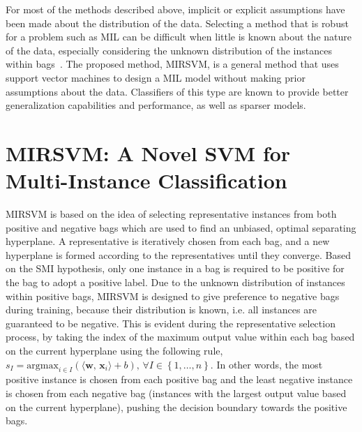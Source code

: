 \documentclass[reqno]{vcuthesis}
\newcommand{\set}[1]{{\left\{#1\right\}}}
\numberwithin{equation}{chapter}
\begin{document}
For most of the methods described above, implicit or explicit assumptions have been made about the distribution of the data. Selecting a method that is robust for a problem such as MIL can be difficult when little is known about the nature of the data, especially considering the unknown distribution of the instances within bags~\cite{Amores2013}. The proposed method, MIRSVM, is a general method that uses support vector machines to design a MIL model without making prior assumptions about the data. Classifiers of this type are known to provide better generalization capabilities and performance, as well as sparser models.

\section{MIRSVM: A Novel SVM for Multi-Instance Classification}
MIRSVM is based on the idea of selecting representative instances from both positive and negative bags which are used to find an unbiased, optimal separating hyperplane. A representative is iteratively chosen from each bag, and a new hyperplane is formed according to the representatives until they converge. Based on the SMI hypothesis, only one instance in a bag is required to be positive for the bag to adopt a positive label. Due to the unknown distribution of instances within positive bags, MIRSVM is designed to give preference to negative bags during training, because their distribution is known, i.e. all instances are guaranteed to be negative. This is evident during the representative selection process, by taking the index of the maximum output value within each bag based on the current hyperplane using the following rule, $s_I = \text{argmax}_{i \in I} (\langle \bm w,\, \bm x_i \rangle + b),\, \forall I \in \set{1,\ldots,n}$. In other words, the most positive instance is chosen from each positive bag and the least negative instance is chosen from each negative bag (instances with the largest output value based on the current hyperplane), pushing the decision boundary  towards the positive bags. 
\end{document}
